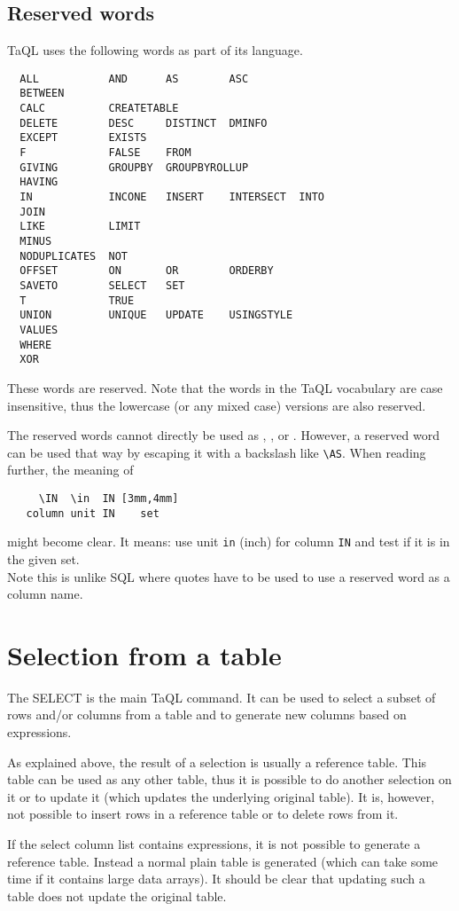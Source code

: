 \subsection{\label{TAQL:RESERVEDWORDS}Reserved words}
TaQL uses the following words as part of its language.
\begin{verbatim}
  ALL           AND      AS        ASC
  BETWEEN 
  CALC          CREATETABLE
  DELETE        DESC     DISTINCT  DMINFO
  EXCEPT        EXISTS
  F             FALSE    FROM
  GIVING        GROUPBY  GROUPBYROLLUP
  HAVING
  IN            INCONE   INSERT    INTERSECT  INTO
  JOIN
  LIKE          LIMIT
  MINUS
  NODUPLICATES  NOT
  OFFSET        ON       OR        ORDERBY
  SAVETO        SELECT   SET
  T             TRUE
  UNION         UNIQUE   UPDATE    USINGSTYLE
  VALUES 
  WHERE
  XOR
\end{verbatim}
These words are reserved. Note that the words in the TaQL vocabulary
are case insensitive, 
thus the lowercase (or any mixed case) versions are also reserved.

The reserved words cannot directly be used as
,
, or 
.
However, a reserved word can be used that way by escaping it with a backslash like
\verb+\+\texttt{AS}. When reading further, the meaning of
\begin{verbatim}
     \IN  \in  IN [3mm,4mm]
   column unit IN    set
\end{verbatim}
might become clear. It means: use unit \texttt{in} (inch) for column
\texttt{IN} and test if it is in the given set. 
\\Note this is unlike SQL where quotes have to be used to use a
reserved word as a column name.

\section{Selection from a table}
The SELECT is the main TaQL command. It can be used to select a subset
of rows and/or columns from a table and to generate new columns based
on expressions.

As explained above, the result of a selection is usually a reference
table. This table can be used as any other table, thus it is possible
to do another selection on it or to update it (which updates the
underlying original table). It is, however, not possible to insert
rows in a reference table or to delete rows from it.

If the select column list contains expressions, it is not possible to
generate a reference table. Instead a normal plain table is generated
(which can take some time if it contains large data arrays).
It should be clear that updating such a table does not update the
original table.

